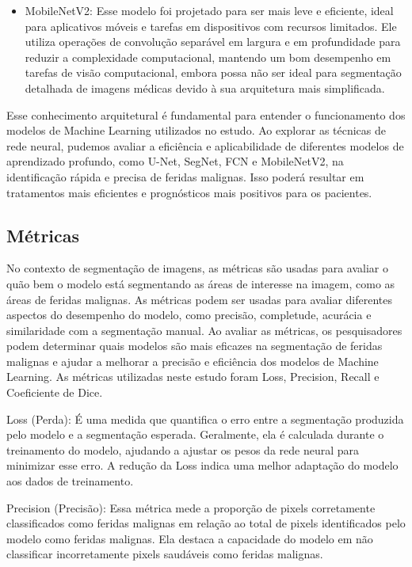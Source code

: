 \begin{itemize}
    \item \ac{MobileNetV2}: Esse modelo foi projetado para ser mais leve e eficiente, ideal para aplicativos móveis e tarefas em dispositivos com recursos limitados. Ele utiliza operações de convolução separável em largura e em profundidade para reduzir a complexidade computacional, mantendo um bom desempenho em tarefas de visão computacional, embora possa não ser ideal para segmentação detalhada de imagens médicas devido à sua arquitetura mais simplificada.

\end{itemize}

Esse conhecimento arquitetural é fundamental para entender o funcionamento dos modelos de Machine Learning utilizados no estudo. Ao explorar as técnicas de rede neural, pudemos avaliar a eficiência e aplicabilidade de diferentes modelos de aprendizado profundo, como \ac{U-Net}, \ac{SegNet}, \ac{FCN} e \ac{MobileNetV2}, na identificação rápida e precisa de feridas malignas. Isso poderá resultar em tratamentos mais eficientes e prognósticos mais positivos para os pacientes.

\subsection{Métricas}

No contexto de segmentação de imagens, as métricas são usadas para avaliar o quão bem o modelo está segmentando as áreas de interesse na imagem, como as áreas de feridas malignas. As métricas podem ser usadas para avaliar diferentes aspectos do desempenho do modelo, como precisão, completude, acurácia e similaridade com a segmentação manual. Ao avaliar as métricas, os pesquisadores podem determinar quais modelos são mais eficazes na segmentação de feridas malignas e ajudar a melhorar a precisão e eficiência dos modelos de Machine Learning. As métricas utilizadas neste estudo foram Loss, Precision, Recall e Coeficiente de Dice. \cite{kelleher2019deep} \cite{taha2015metrics} \cite{guan2022informing}

Loss (Perda): É uma medida que quantifica o erro entre a segmentação produzida pelo modelo e a segmentação esperada. Geralmente, ela é calculada durante o treinamento do modelo, ajudando a ajustar os pesos da rede neural para minimizar esse erro. A redução da Loss indica uma melhor adaptação do modelo aos dados de treinamento.

Precision (Precisão): Essa métrica mede a proporção de pixels corretamente classificados como feridas malignas em relação ao total de pixels identificados pelo modelo como feridas malignas. Ela destaca a capacidade do modelo em não classificar incorretamente pixels saudáveis como feridas malignas.

